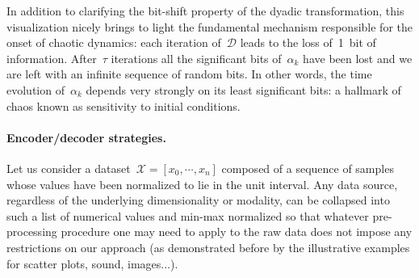 \documentclass{article}
\begin{document}
\begin{center}
 \end{center} 

\noindent In addition to clarifying the bit-shift property of the dyadic transformation, this visualization nicely brings to light the fundamental mechanism responsible for the onset of chaotic dynamics: each iteration of~$\mathcal{D}$ leads to the loss of~1~bit of information.  After~$\tau$ iterations all the significant bits of~$\alpha_k$ have been lost and we are left with an infinite sequence of random bits.  In other words, the time evolution of~$\alpha_k$ depends very strongly on its least significant bits: a hallmark of chaos known as sensitivity to initial conditions.

\newpage

\paragraph{Encoder/decoder strategies.}  Let us consider a dataset~$\mathcal{X} = [ x_0, \cdots , x_n ]$ composed of a sequence of samples whose values have been normalized to lie in the unit interval. Any data source, regardless of the underlying dimensionality or modality, can be collapsed into such a list of numerical values and min-max normalized so that whatever pre-processing procedure one may need to apply to the raw data does not impose any restrictions on our approach (as demonstrated before by the illustrative examples for scatter plots, sound, images...). \\
\end{document}
